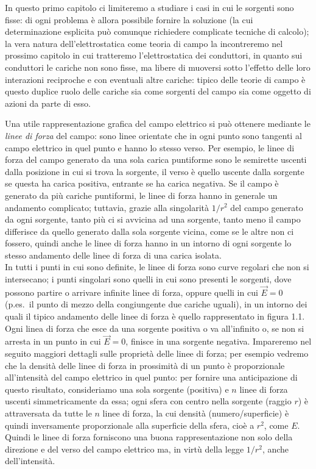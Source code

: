 In questo primo capitolo ci limiteremo a studiare i casi in cui le sorgenti sono fisse: di ogni problema è allora possibile fornire la soluzione (la cui determinazione esplicita può comunque richiedere complicate tecniche di calcolo); la vera natura dell'elettrostatica come teoria di campo la incontreremo nel prossimo capitolo in cui tratteremo l'elettrostatica dei conduttori, in quanto sui conduttori le cariche non sono fisse, ma libere di muoversi sotto l'effetto delle loro interazioni reciproche e con eventuali altre cariche: tipico delle teorie di campo è questo duplice ruolo delle cariche sia come sorgenti del campo sia come oggetto di azioni da parte di esso.

Una utile rappresentazione grafica del campo elettrico si può ottenere mediante le \emph{linee di forza} del campo: sono linee orientate che in ogni punto sono tangenti al campo
elettrico in quel punto e hanno lo stesso verso. Per esempio, le linee di forza del campo generato da una sola carica puntiforme sono le semirette uscenti dalla posizione in cui si trova la sorgente, il verso è quello uscente dalla sorgente se questa ha carica positiva, entrante se ha carica negativa. Se il campo è generato da più cariche puntiformi, le linee di forza hanno in generale un andamento complicato; tuttavia, grazie alla singolarità $1/r^2$ del campo generato da ogni sorgente, tanto più ci si avvicina ad una sorgente, tanto meno il campo differisce da quello generato dalla sola sorgente vicina, come se le altre non ci fossero, quindi anche le linee di forza hanno in un intorno di ogni sorgente lo stesso andamento delle linee di forza di una carica isolata.\\
In tutti i punti in cui sono definite, le linee di forza sono curve regolari che non si intersecano; i punti singolari sono quelli in cui sono presenti le sorgenti, dove possono partire o arrivare infinite linee di forza, oppure quelli in cui $\vec E=0$ (p.es.\ il punto di mezzo della congiungente due cariche uguali), in un intorno dei quali il tipico andamento delle linee di forza è quello rappresentato in figura 1.1.
Ogni linea di forza che esce da una sorgente positiva o va all'infinito o, se non si arresta in un punto in cui $\vec E=0$, finisce in una sorgente negativa. Impareremo nel seguito maggiori dettagli sulle proprietà delle linee di forza; per esempio vedremo che la densità delle linee di forza in prossimità di un punto è proporzionale all'intensità del campo elettrico in quel punto: per fornire una anticipazione di questo risultato, consideriamo una sola sorgente (positiva) e $n$ linee di forza uscenti simmetricamente da essa; ogni sfera con centro nella sorgente (raggio $r$) è attraversata da tutte le $n$ linee di forza, la cui densità (numero/superficie) è quindi inversamente proporzionale alla superficie della sfera, cioè a $r^2$, come $E$. Quindi le linee di forza forniscono una buona rappresentazione non solo della direzione e del verso del campo elettrico ma, in virtù della legge $1/r^2$, anche dell'intensità.

